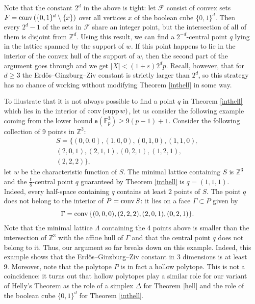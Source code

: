 \documentclass{daj}
\renewcommand{\ge}{\geqslant}
\newcommand{\s}{\mathfrak s}
\newcommand{\Z}{\mathbb Z}
\newcommand{\FF}{\mathbb F}
\newcommand{\conv}{{\rm conv}\,}
\newcommand{\F}{\mathcal F}
\theoremstyle{definition}
\theoremstyle{remark}
\theoremstyle{definition}
\theoremstyle{definition}
\begin{document}
Note that the constant $2^d$ in the above is tight: let $\F$ consist of convex sets $F=\conv (\{ 0, 1\}^d \setminus \{x\})$ over all vertices $x$ of the boolean cube $\{0, 1\}^d$. Then every $2^{d}-1$ of the sets in $\F$ share an integer point, but the intersection of all of them is disjoint from $\Z^d$. Using this result, we can find a $2^{-d}$-central point $q$ lying in the lattice spanned by the support of $w$. If this point happens to lie in the interior of the convex hull of the support of $w$, then the second part of the argument goes through and we get $|X| < (1+\varepsilon) 2^d p$. Recall, however, that for $d\ge 3$ the Erd{\H o}s--Ginzburg--Ziv constant is strictly larger than $2^d$, so this strategy has no chance of working without modifying Theorem \ref{inthell} in some way. 

To illustrate that it is not always possible to find a point $q$ in Theorem \ref{inthell} which lies in the interior of $\conv(\operatorname{supp}w)$, let us consider the following example coming from the lower bound $\s(\FF_p^3) \ge 9(p-1)+1$. Consider the following collection of 9 points in $\Z^3$:
\begin{align*}
S = \{ (0, 0, 0), (1, 0, 0), (0, 1, 0), (1, 1, 0),\\
    (2, 0, 1), (2, 1, 1), (0, 2, 1), (1, 2, 1),\\
    (2, 2, 2)\},    
\end{align*}
let $w$ be the characteristic function of $S$. The minimal lattice containing $S$ is $\Z^3$ and the $\frac18$-central point $q$ guaranteed by Theorem \ref{inthell} is $q = (1, 1, 1)$. Indeed, every half-space containing $q$ contains at least $2$ points of $S$. The point $q$ does not belong to the interior of $P = \conv S$: it lies on a face $\Gamma \subset P$ given by 
$$
\Gamma = \conv\{ (0, 0, 0), (2, 2, 2), (2, 0, 1), (0, 2, 1) \}.
$$
Note that the minimal lattice $\Lambda$ containing the 4 points above is smaller than the intersection of $\Z^3$ with the affine hull of $\Gamma$ and that the central point $q$ does not belong to it. Thus, our argument so far breaks down on this example. Indeed, this example shows that the Erd{\H o}s--Ginzburg--Ziv constant in 3 dimensions is at least 9. Moreover, note that the polytope $P$ is in fact a hollow polytope. 
This is not a coincidence: it turns out that hollow polytopes play a similar role for our variant of Helly's Theorem as the role of a simplex $\Delta$ for Theorem \ref{hell} and the role of the boolean cube $\{0, 1\}^d$ for Theorem \ref{inthell}. 
\end{document}
